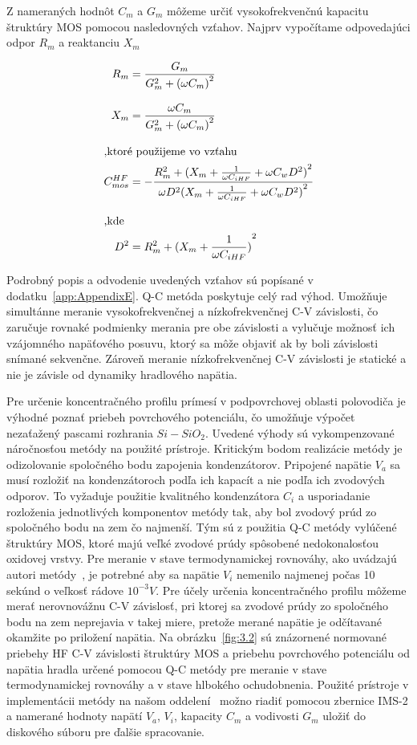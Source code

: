 Z nameraných hodnôt $C_m$ a $G_m$ môžeme určiť vysokofrekvenčnú
kapacitu štruktúry MOS pomocou nasledovných vzťahov.  Najprv
vypočítame odpovedajúci odpor $R_m$ a reaktanciu $X_m$

\begin{subequations}\label{eq:3.3}
  \begin{align}
    R_m &= \frac{G_m}{G^2_m + {(\omega C_m)}^2}\label{eq:3.3a}\\[0.3cm]
    X_m &= \frac{\omega C_m}{G^2_m + {(\omega C_m)}^2}\label{eq:3.3b}\\[0.3cm]
    \intertext{,ktoré použijeme vo vzťahu}
    C^{HF}_{mos} &= - \cfrac{R^2_m + {(X_m + \frac{1}{\omega C_{iHF}} + \omega C_w D^2)}^2}{\omega D^2{(X_m + \frac{1}{\omega C_{iHF}} + \omega C_{w} D^2)}^2}\label{eq:3.3c}\\[0.3cm]
    \intertext{,kde}
    D^2 &= R^2_m + {(X_m + \frac{1}{\omega C_{iHF}})}^2\label{eq:3.3d}
  \end{align}
\end{subequations}

Podrobný popis a odvodenie uvedených vzťahov sú popísané v
dodatku~\ref{app:AppendixE}. Q-C metóda poskytuje celý rad výhod.
Umožňuje simultánne meranie vysokofrekvenčnej a nízkofrekvenčnej C-V
závislosti, čo zaručuje rovnaké podmienky merania pre obe závislosti a
vylučuje možnosť ich vzájomného napäťového posuvu, ktorý sa môže
objaviť ak by boli závislosti snímané sekvenčne. Zároveň meranie
nízkofrekvenčnej C-V závislosti je statické a nie je závisle od
dynamiky hradlového napätia.

Pre určenie koncentračného profilu prímesí v podpovrchovej oblasti
polovodiča je výhodné poznať priebeh povrchového potenciálu, čo
umožňuje výpočet nezaťažený pascami rozhrania $Si-SiO_2$. Uvedené
výhody sú vykompenzované náročnosťou metódy na použité prístroje.
Kritickým bodom realizácie metódy je odizolovanie spoločného bodu
zapojenia kondenzátorov. Pripojené napätie $V_a$ sa musí rozložiť na
kondenzátoroch podľa ich kapacít a nie podľa ich zvodových odporov.
To vyžaduje použitie kvalitného kondenzátora $C_i$ a usporiadanie
rozloženia jednotlivých komponentov metódy tak, aby bol zvodový prúd
zo spoločného bodu na zem čo najmenší. Tým sú z použitia Q-C metódy
vylúčené štruktúry MOS, ktoré majú veľké zvodové prúdy spôsobené
nedokonalosťou oxidovej vrstvy. Pre meranie v stave termodynamickej
rovnováhy, ako uvádzajú autori metódy~\cite{3.7}, je potrebné aby sa
napätie $V_i$ nemenilo najmenej počas 10 sekúnd o veľkosť rádove
$10^{-3}V$. Pre účely určenia koncentračného profilu môžeme merať
nerovnovážnu C-V závislosť, pri ktorej sa zvodové prúdy zo spoločného
bodu na zem neprejavia v takej miere, pretože merané napätie je
odčítavané okamžite po priložení napätia. Na obrázku~\ref{fig:3.2} sú
znázornené normované priebehy HF C-V závislosti štruktúry MOS a
priebehu povrchového potenciálu od napätia hradla určené pomocou Q-C
metódy pre meranie v stave termodynamickej rovnováhy a v stave
hlbokého ochudobnenia. Použité prístroje v implementácii metódy na
našom oddelení~\cite{3.8,3.9} možno riadiť pomocou zbernice IMS-2 a
namerané hodnoty napätí $V_a$, $V_i$, kapacity $C_m$ a vodivosti $G_m$
uložiť do diskového súboru pre ďalšie spracovanie.

